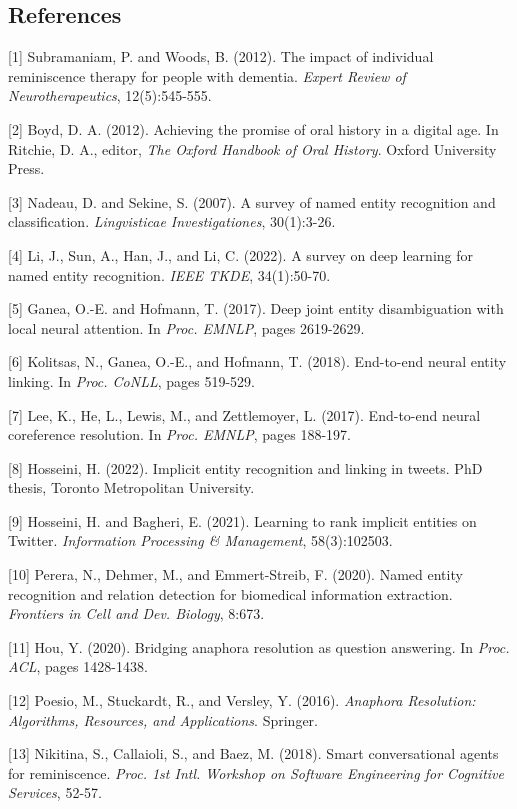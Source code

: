 \documentclass[
]{article}
\begin{document}
\subsection{References}\label{references}

{[}1{]} Subramaniam, P. and Woods, B. (2012). The impact of individual
reminiscence therapy for people with dementia. \emph{Expert Review of
Neurotherapeutics}, 12(5):545-555.

{[}2{]} Boyd, D. A. (2012). Achieving the promise of oral history in a
digital age. In Ritchie, D. A., editor, \emph{The Oxford Handbook of
Oral History}. Oxford University Press.

{[}3{]} Nadeau, D. and Sekine, S. (2007). A survey of named entity
recognition and classification. \emph{Lingvisticae Investigationes},
30(1):3-26.

{[}4{]} Li, J., Sun, A., Han, J., and Li, C. (2022). A survey on deep
learning for named entity recognition. \emph{IEEE TKDE}, 34(1):50-70.

{[}5{]} Ganea, O.-E. and Hofmann, T. (2017). Deep joint entity
disambiguation with local neural attention. In \emph{Proc. EMNLP}, pages
2619-2629.

{[}6{]} Kolitsas, N., Ganea, O.-E., and Hofmann, T. (2018). End-to-end
neural entity linking. In \emph{Proc. CoNLL}, pages 519-529.

{[}7{]} Lee, K., He, L., Lewis, M., and Zettlemoyer, L. (2017).
End-to-end neural coreference resolution. In \emph{Proc. EMNLP}, pages
188-197.

{[}8{]} Hosseini, H. (2022). Implicit entity recognition and linking in
tweets. PhD thesis, Toronto Metropolitan University.

{[}9{]} Hosseini, H. and Bagheri, E. (2021). Learning to rank implicit
entities on Twitter. \emph{Information Processing \& Management},
58(3):102503.

{[}10{]} Perera, N., Dehmer, M., and Emmert-Streib, F. (2020). Named
entity recognition and relation detection for biomedical information
extraction. \emph{Frontiers in Cell and Dev. Biology}, 8:673.

{[}11{]} Hou, Y. (2020). Bridging anaphora resolution as question
answering. In \emph{Proc. ACL}, pages 1428-1438.

{[}12{]} Poesio, M., Stuckardt, R., and Versley, Y. (2016).
\emph{Anaphora Resolution: Algorithms, Resources, and Applications}.
Springer.

{[}13{]} Nikitina, S., Callaioli, S., and Baez, M. (2018). Smart
conversational agents for reminiscence. \emph{Proc. 1st Intl. Workshop
on Software Engineering for Cognitive Services}, 52-57.
\end{document}
